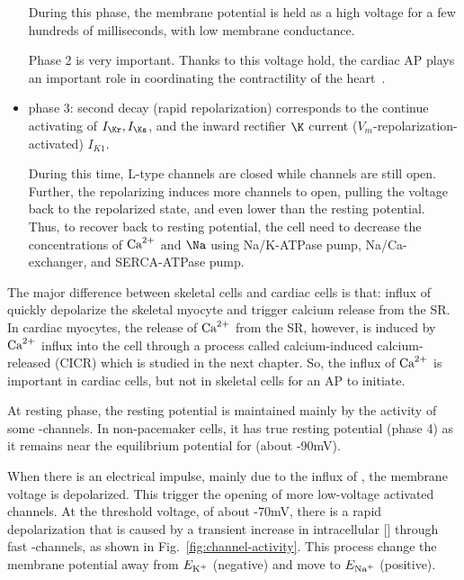 \begin{itemize}
  During this phase, the membrane potential is held as a high voltage
  for a few hundreds of milliseconds, with low membrane conductance.

\begin{framed}
  Phase 2 is very important. Thanks to this voltage hold, the cardiac
  AP plays an important role in coordinating the contractility of the
  heart~\citep{kleber2004bmc}.
\end{framed}

\item phase 3: second decay (rapid repolarization) corresponds to the
  continue activating of $I_\Kr, I_\Ks$, and the inward rectifier $\K$
  current ($V_m$-repolarization-activated) $I_{K1}$.

  During this time, L-type channels are closed while  channels are still
  open. Further, the repolarizing induces more  channels to open, pulling
  the voltage back to the repolarized state, and even lower than the resting
  potential. Thus, to recover back to resting potential, the cell need to
  decrease the concentrations of ${\text{Ca}^{2+}}$ and $\Na$ using Na/K-ATPase pump,
  Na/Ca-exchanger, and SERCA-ATPase pump.
\end{itemize}


\begin{framed}
  
  The major difference between skeletal cells and cardiac cells is that:
  influx of  quickly depolarize the skeletal myocyte and trigger
  calcium release from the SR. In cardiac myocytes, the release of
  ${\text{Ca}^{2+}}$ from the SR, however, is induced by ${\text{Ca}^{2+}}$ influx into
  the cell through a process called calcium-induced calcium-released
  (CICR) which is studied in the next chapter. So, the influx of ${\text{Ca}^{2+}}$
  is important in cardiac cells, but not in skeletal cells for an AP to
  initiate.
\end{framed}

At resting phase, the resting potential is maintained mainly by
the activity of some -channels. In non-pacemaker cells, it
has true resting potential (phase 4) as it remains near the
equilibrium potential for  (about -90mV). 

When there is an electrical impulse, mainly due to the influx of
, the membrane voltage is depolarized. This trigger the
opening of more low-voltage activated  channels.  At the
threshold voltage, of about -70mV, there is a rapid depolarization
that is caused by a transient increase in intracellular []
through fast -channels, as shown in
Fig.~\ref{fig:channel-activity}.  This process change the membrane
potential away from $E_{\ce{K+}}$ (negative) and move to $E_{\ce{Na+}}$
(positive).

